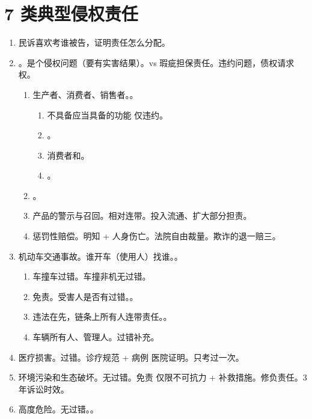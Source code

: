 \section{7 类典型侵权责任}
\begin{enumerate}
  \item 民诉喜欢考谁被告，证明责任怎么分配。
  \item {}。是个侵权问题（要有实害结果）。vs 瑕疵担保责任。违约问题，债权请求权。
        \begin{enumerate}
          \item 生产者、消费者、销售者。。
                \begin{enumerate}
                  \item 不具备应当具备的功能 \yjt 仅违约。
                  \item {}。
                  \item 消费者和。
                  \item {}。
                \end{enumerate}
          \item {}。
          \item 产品的警示与召回。相对连带。投入流通、扩大部分担责。
          \item 惩罚性赔偿。明知 + 人身伤亡。法院自由裁量。\bdy 欺诈的退一赔三。
        \end{enumerate}
  \item 机动车交通事故。谁开车（使用人）找谁。。
        \begin{enumerate}
          \item \yi 车撞车过错。\er 车撞非机无过错。
          \item 免责。受害人是否有过错。。
          \item 违法在先，链条上所有人连带责任。。
          \item 车辆所有人、管理人。过错补充。
        \end{enumerate}
  \item 医疗损害。过错。诊疗规范 + 病例 \yjt 医院证明。只考过一次。
  \item 环境污染和生态破坏。无过错。免责 \yjt 仅限不可抗力 + 补救措施。修负责任。3 年诉讼时效。
  \item 高度危险。无过错。。

\end{enumerate}
